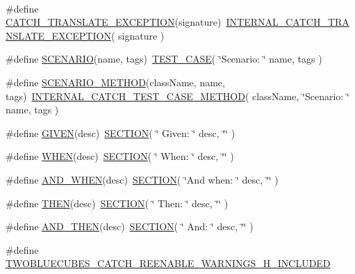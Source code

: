 \begin{DoxyCompactItemize}
$$\item 
\#define \hyperlink{a00094_a094602ff56422c96e501eaaef1ef8c12}{C\+A\+T\+C\+H\+\_\+\+T\+R\+A\+N\+S\+L\+A\+T\+E\+\_\+\+E\+X\+C\+E\+P\+T\+I\+O\+N}(signature)~\hyperlink{a00094_a109d814750b0a695e2b66e9c53e748c0}{I\+N\+T\+E\+R\+N\+A\+L\+\_\+\+C\+A\+T\+C\+H\+\_\+\+T\+R\+A\+N\+S\+L\+A\+T\+E\+\_\+\+E\+X\+C\+E\+P\+T\+I\+O\+N}( signature )
\item 
\#define \hyperlink{a00094_a9f0ab245cdba000deb91cdfb16808059}{S\+C\+E\+N\+A\+R\+I\+O}(name,  tags)~\hyperlink{a00109_adc967649a56c42f3977c8b7e71cc67e9}{T\+E\+S\+T\+\_\+\+C\+A\+S\+E}( \char`\"{}Scenario\+: \char`\"{} name, tags )
\item 
\#define \hyperlink{a00094_af3463f70ca99312394bb2850802e7fb3}{S\+C\+E\+N\+A\+R\+I\+O\+\_\+\+M\+E\+T\+H\+O\+D}(class\+Name,  name,  tags)~\hyperlink{a00094_a46bb9f683226dfa2c857dd62af7aa106}{I\+N\+T\+E\+R\+N\+A\+L\+\_\+\+C\+A\+T\+C\+H\+\_\+\+T\+E\+S\+T\+\_\+\+C\+A\+S\+E\+\_\+\+M\+E\+T\+H\+O\+D}( class\+Name, \char`\"{}Scenario\+: \char`\"{} name, tags )
\item 
\#define \hyperlink{a00094_a2b70c603786d759242856d883dbe93bd}{G\+I\+V\+E\+N}(desc)~\hyperlink{a00094_afcb669b40babf8726c969fce8d2cd94b}{S\+E\+C\+T\+I\+O\+N}( \char`\"{}   Given\+: \char`\"{} desc, \char`\"{}\char`\"{} )
\item 
\#define \hyperlink{a00094_ab09e9b8186233f676ce6a23aebe89d6e}{W\+H\+E\+N}(desc)~\hyperlink{a00094_afcb669b40babf8726c969fce8d2cd94b}{S\+E\+C\+T\+I\+O\+N}( \char`\"{}    When\+: \char`\"{} desc, \char`\"{}\char`\"{} )
\item 
\#define \hyperlink{a00094_a054a37584492a5dfbdb5ee0f2fc10b7a}{A\+N\+D\+\_\+\+W\+H\+E\+N}(desc)~\hyperlink{a00094_afcb669b40babf8726c969fce8d2cd94b}{S\+E\+C\+T\+I\+O\+N}( \char`\"{}And when\+: \char`\"{} desc, \char`\"{}\char`\"{} )
\item 
\#define \hyperlink{a00094_a27987092139727fd7a471b5f74dc62de}{T\+H\+E\+N}(desc)~\hyperlink{a00094_afcb669b40babf8726c969fce8d2cd94b}{S\+E\+C\+T\+I\+O\+N}( \char`\"{}    Then\+: \char`\"{} desc, \char`\"{}\char`\"{} )
\item 
\#define \hyperlink{a00094_aafdc2a6cfbcecedec25e64bcbd6c09c6}{A\+N\+D\+\_\+\+T\+H\+E\+N}(desc)~\hyperlink{a00094_afcb669b40babf8726c969fce8d2cd94b}{S\+E\+C\+T\+I\+O\+N}( \char`\"{}     And\+: \char`\"{} desc, \char`\"{}\char`\"{} )
\item 
\#define \hyperlink{a00094_a3819417b11fa6717f32f8ae1ff69d170}{T\+W\+O\+B\+L\+U\+E\+C\+U\+B\+E\+S\+\_\+\+C\+A\+T\+C\+H\+\_\+\+R\+E\+E\+N\+A\+B\+L\+E\+\_\+\+W\+A\+R\+N\+I\+N\+G\+S\+\_\+\+H\+\_\+\+I\+N\+C\+L\+U\+D\+E\+D}
\end{DoxyCompactItemize}
